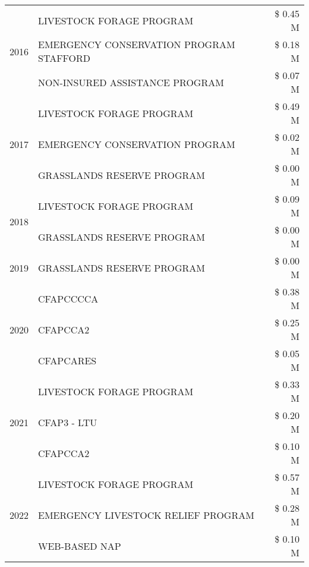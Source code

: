 \begin{tabular}{llr}
\cline{1-3}
\multirow[t]{3}{*}{2016} & LIVESTOCK FORAGE PROGRAM & \$ 0.45 M \\
 & EMERGENCY CONSERVATION PROGRAM STAFFORD & \$ 0.18 M \\
 & NON-INSURED ASSISTANCE PROGRAM & \$ 0.07 M \\
\cline{1-3}
\multirow[t]{3}{*}{2017} & LIVESTOCK FORAGE PROGRAM & \$ 0.49 M \\
 & EMERGENCY CONSERVATION PROGRAM & \$ 0.02 M \\
 & GRASSLANDS RESERVE PROGRAM & \$ 0.00 M \\
\cline{1-3}
\multirow[t]{2}{*}{2018} & LIVESTOCK FORAGE PROGRAM & \$ 0.09 M \\
 & GRASSLANDS RESERVE PROGRAM & \$ 0.00 M \\
\cline{1-3}
2019 & GRASSLANDS RESERVE PROGRAM & \$ 0.00 M \\
\cline{1-3}
\multirow[t]{3}{*}{2020} & CFAPCCCCA & \$ 0.38 M \\
 & CFAPCCA2 & \$ 0.25 M \\
 & CFAPCARES & \$ 0.05 M \\
\cline{1-3}
\multirow[t]{3}{*}{2021} & LIVESTOCK FORAGE PROGRAM & \$ 0.33 M \\
 & CFAP3 - LTU & \$ 0.20 M \\
 & CFAPCCA2 & \$ 0.10 M \\
\cline{1-3}
\multirow[t]{3}{*}{2022} & LIVESTOCK FORAGE PROGRAM & \$ 0.57 M \\
 & EMERGENCY LIVESTOCK RELIEF PROGRAM & \$ 0.28 M \\
 & WEB-BASED NAP & \$ 0.10 M \\
\cline{1-3}
\bottomrule
\end{tabular}
